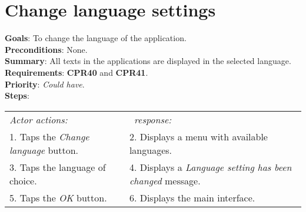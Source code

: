 \section{Change language settings}
 \label{changelang}
  \textbf{Goals}: To change the language of the application.\\
  \textbf{Preconditions}: None.\\
  \textbf{Summary}: All texts in the applications are displayed in the selected language.\\
  \textbf{Requirements}: \textbf{CPR40} and \textbf{CPR41}.\\
  \textbf{Priority}: \emph{Could have}.\\
  \textbf{Steps}: \\
    \begin{tabular}{ p{} p{} }
  	\emph{Actor actions:} & \emph{\projectname\ response:} \\
  	1. Taps the \emph{Change language} button. & 2. Displays a menu with available languages. \\
  	3. Taps the language of choice. & 4. Displays a \emph{Language setting has been changed} message. \\
  	5. Taps the \emph{OK} button. & 6. Displays the main interface.\\
    \end{tabular}
